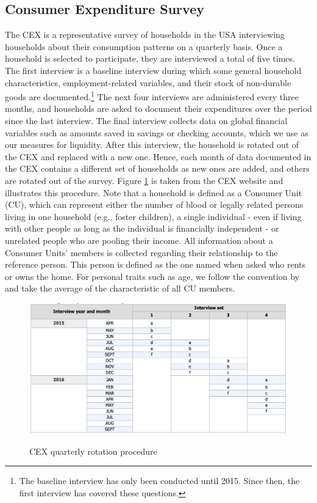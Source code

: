 \subsection{Consumer Expenditure Survey} 
The CEX is a representative survey of households in the USA interviewing households about their consumption patterns on a quarterly basis. Once a household is selected to participate, they are interviewed a total of five times. The first interview is a baseline interview during which some general household characteristics, employment-related variables, and their stock of non-durable goods are documented.\footnote{The baseline interview has only been conducted until 2015. Since then, the first interview has covered these questions.} The next four interviews are administered every three months, and households are asked to document their expenditures over the period since the last interview. The final interview collects data on global financial variables such as amounts saved in savings or checking accounts, which we use as our measures for liquidity. After this interview, the household is rotated out of the CEX and replaced with a new one. Hence, each month of data documented in the CEX contains a different set of households as new ones are added, and others are rotated out of the survey. Figure \ref{fig:cex_rotation} is taken from the CEX website and illustrates this procedure. Note that a household is defined as a Consumer Unit (CU), which can represent either the number of blood or legally related persons living in one household (e.g., foster children), a single individual - even if living with other people as long as the individual is financially independent - or unrelated people who are pooling their income. All information about a Consumer Units' members is collected regarding their relationship to the reference person. This person is defined as the one named when asked who rents or owns the home. For personal traits such as age, we follow the convention by \cite{parker_etal_13} and take the average of the characteristic of all CU members.
\begin{figure}[t]
    \caption{CEX quarterly rotation procedure}
    \centering
    \includegraphics[width=.9\linewidth]{figures/CEX_rotation_table.png}
    \label{fig:cex_rotation}
\end{figure}
